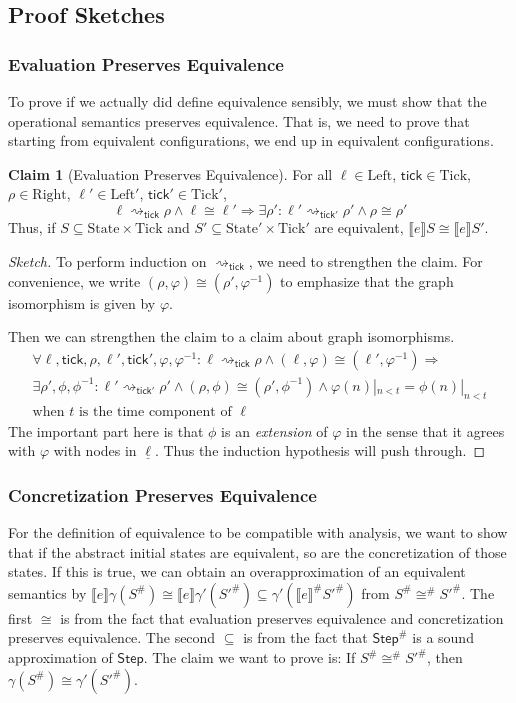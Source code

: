 \documentclass{article}
\theoremstyle{definition}
\newtheorem{clm}{Claim}[section]
\newcommand*{\Abs}[1]{{#1}^{\#}}
\newcommand*{\Left}{\text{Left}}
\newcommand*{\Right}{\text{Right}}
\newcommand*{\State}{\text{State}}
\newcommand*{\Tick}{\text{Tick}}
\newcommand*{\Step}{\mathsf{Step}}
\newcommand*{\semarrow}{\rightsquigarrow}
\newcommand*{\sembracket}[1]{\lBrack{#1}\rBrack}
\newcommand*{\tick}{\mathsf{tick}}
\begin{document}
\subsection{Proof Sketches}
\subsubsection{Evaluation Preserves Equivalence}
To prove if we actually did define equivalence sensibly, we must show that the operational semantics preserves equivalence.
That is, we need to prove that starting from equivalent configurations, we end up in equivalent configurations.
\begin{clm}[Evaluation Preserves Equivalence]
  For all $\ell\in\Left$, $\tick\in\Tick$, $\rho\in\Right$, $\ell'\in\Left'$, $\tick'\in\Tick'$,
  \[\ell\semarrow_{\tick}\rho\wedge\ell\cong\ell'\Rightarrow\exists\rho':\ell'\semarrow_{\tick'}\rho'\wedge\rho\cong\rho'\]
  Thus, if $S\subseteq\State\times\Tick$ and $S'\subseteq\State'\times\Tick'$ are equivalent, $\sembracket{e}S\cong\sembracket{e}S'$.
\end{clm}
\begin{proof}[Sketch]
  To perform induction on $\semarrow_\tick$, we need to strengthen the claim.
  For convenience, we write $(\rho,\varphi)\cong(\rho',\varphi^{-1})$ to emphasize that the graph isomorphism is given by $\varphi$.

  Then we can strengthen the claim to a claim about graph isomorphisms.
  \[
    \begin{array}{l}
      \forall\ell,\tick,\rho,\ell',\tick',\varphi,\varphi^{-1}:\ell\semarrow_{\tick}\rho\wedge(\ell,\varphi)\cong(\ell',\varphi^{-1})\Rightarrow \\
      \exists\rho',\phi,\phi^{-1}:\ell'\semarrow_{\tick'}\rho'\wedge(\rho,\phi)\cong(\rho',\phi^{-1})\wedge\varphi(n)|_{n<t}=\phi(n)|_{n<t}      \\
      \text{when }t\text{ is the time component of }\ell
    \end{array}
  \]
  The important part here is that $\phi$ is an \emph{extension} of $\varphi$ in the sense that it agrees with $\varphi$ with nodes in $\underline{\ell}$.
  Thus the induction hypothesis will push through.
\end{proof}

\subsubsection{Concretization Preserves Equivalence}
For the definition of equivalence to be compatible with analysis, we want to show that if the abstract initial states are equivalent, so are the concretization of those states.
If this is true, we can obtain an overapproximation of an equivalent semantics by $\sembracket{e}\gamma(\Abs{S})\cong\sembracket{e}\gamma'(\Abs{S'})\subseteq\gamma'(\Abs{\sembracket{e}}\Abs{S'})$ from $\Abs{S}\Abs\cong\Abs{S'}$.
The first $\cong$ is from the fact that evaluation preserves equivalence and concretization preserves equivalence.
The second $\subseteq$ is from the fact that $\Abs\Step$ is a sound approximation of $\Step$.
The claim we want to prove is: If $\Abs{S}\Abs\cong\Abs{S'}$, then $\gamma(\Abs{S})\cong\gamma'(\Abs{S'})$.
\end{document}
